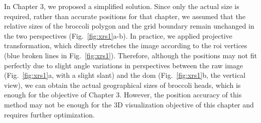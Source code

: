 In Chapter 3, we proposed a simplified solution. Since only the actual size is required, rather than accurate positions for that chapter, we assumed that the relative sizes of the broccoli polygon and the grid boundary remain unchanged in the two perspectives (Fig.~\ref{fig:xrs1}a-b). In practice, we applied projective transformation, which directly stretches the image according to the \gls{roi} vertices (blue broken lines in Fig.~\ref{fig:xrs1}). Therefore, although the positions may not fit perfectly due to slight angle variations in perspectives between the raw image (Fig.~\ref{fig:xrs1}a, with a slight slant) and the \gls{dom} (Fig.~\ref{fig:xrs1}b, the vertical view), we can obtain the actual geographical sizes of broccoli heads, which is enough for the objective of Chapter 3. However, the position accuracy of this method may not be enough for the 3D visualization objective of this chapter and requires further optimization.




